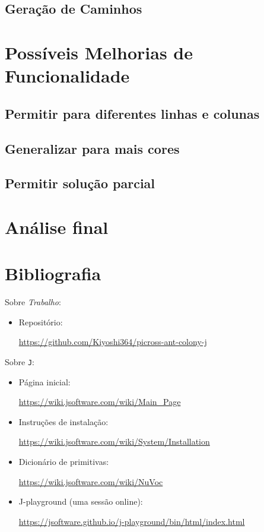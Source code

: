 \documentclass{article}
\newcommand{\lang}{\texttt{J}}
\begin{document}
\subsection{Geração de Caminhos}

\section{Possíveis Melhorias de Funcionalidade}
\subsection{Permitir para diferentes linhas e colunas}
\subsection{Generalizar para mais cores}
\subsection{Permitir solução parcial}

\section{Análise final}

\section{Bibliografia} \label{s:bib}

Sobre \emph{Trabalho}:
\begin{itemize}
    \item Repositório: \par
    \url{https://github.com/Kiyoshi364/picross-ant-colony-j}
\end{itemize}

\noindent
Sobre \lang{}:
\begin{itemize}
    \item Página inicial: \par
        \url{https://wiki.jsoftware.com/wiki/Main_Page}
    \item Instruções de instalação: \par
        \url{https://wiki.jsoftware.com/wiki/System/Installation}
    \item Dicionário de primitivas: \par
        \url{https://wiki.jsoftware.com/wiki/NuVoc}
    \item J-playground (uma sessão online): \par
        \url{https://jsoftware.github.io/j-playground/bin/html/index.html}
\end{itemize}
\end{document}
